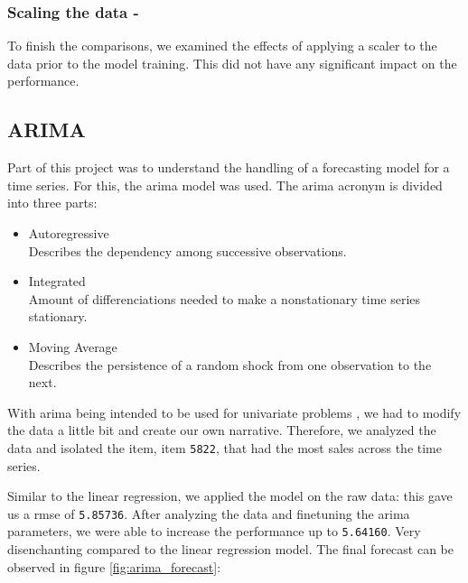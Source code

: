 \subsubsection{Scaling the data - }

To finish the comparisons, we examined the effects of applying a scaler to the data prior to the model training. This did not have any significant impact on the performance.


\subsection{ARIMA}

Part of this project was to understand the handling of a forecasting model for a time series. 
For this, the \acrfull{arima} model was used. The \acrshort{arima} acronym is divided into three parts: \cite{MultivariateStatisticsARIMA}

\begin{itemize}
	\vspace*{-3mm}
	\item Autoregressive\\
	Describes the dependency among successive observations.
	\vspace*{-3mm}
	\item Integrated\\
	Amount of differenciations needed to make a nonstationary time series stationary.
	\vspace*{-3mm}
	\item Moving Average\\
	Describes the persistence of a random shock from one observation to the next.
\end{itemize}

With \acrshort{arima} being intended to be used for univariate problems \cite{Gron2017HandsOnML}, we had to modify the data a little bit and create our own narrative. Therefore, we analyzed the data and isolated the item, item \texttt{5822}, that had the most sales across the time series.

Similar to the linear regression, we applied the model on the raw data: this gave us a \acrshort{rmse} of \texttt{5.85736}. After analyzing the data and finetuning the \acrshort{arima} parameters, we were able to increase the performance up to \texttt{5.64160}. Very disenchanting compared to the linear regression model. The final forecast can be observed in figure \ref{fig:arima_forecast}:

